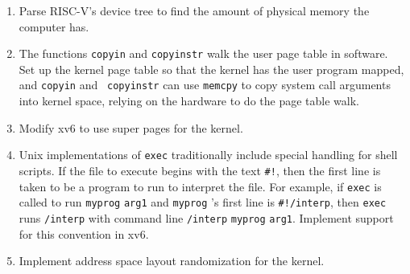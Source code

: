 \begin{enumerate}
  
\item Parse RISC-V's device tree to find the amount of physical memory
the computer has.

\item The functions {\tt copyin} and {\tt copyinstr} walk the user
  page table in software.  Set up the kernel page table so that the
  kernel has the user program mapped, and {\tt copyin} and {\tt
    copyinstr} can use {\tt memcpy} to copy system call arguments into
  kernel space, relying on the hardware to do the page table walk.

\item Modify xv6 to use super pages for the kernel.

\item Unix implementations of
\lstinline{exec}
traditionally include special handling for shell scripts.
If the file to execute begins with the text
\lstinline{#!},
then the first line is taken to be a program
to run to interpret the file.
For example, if
\lstinline{exec}
is called to run
\lstinline{myprog}
\lstinline{arg1}
and
\lstinline{myprog} 's
first line is
\lstinline{#!/interp},
then
\lstinline{exec}
runs
\lstinline{/interp}
with command line
\lstinline{/interp}
\lstinline{myprog}
\lstinline{arg1}.
Implement support for this convention in xv6.

\item Implement address space layout randomization for the kernel.

\end{enumerate}
